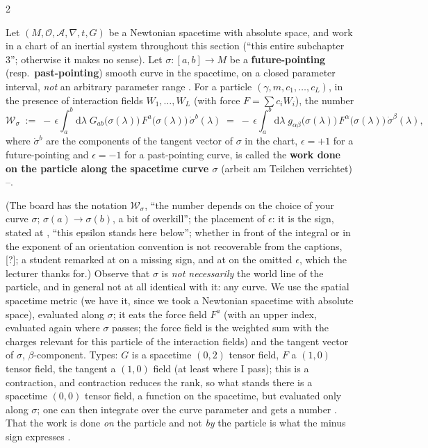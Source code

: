 \begin{paracol}{2}
\begin{definition}\label{def:nd-work}
Let $(M,\mathcal O,\mathcal A,\nabla,t,G)$ be a Newtonian spacetime with absolute space, and work in a chart of an inertial system throughout this section (``this entire subchapter 3''; otherwise it makes no sense). Let $\sigma\colon[a,b]\to M$ be a
\textbf{future-pointing} (resp.\ \textbf{past-pointing}) smooth curve in the spacetime, on a closed parameter interval, \emph{not} an arbitrary parameter range . For a particle $(\gamma,m,c_1,\dots,c_L)$, in the presence of interaction fields $W_1,\dots,W_L$ (with force $F=\sum c_iW_i$), the number
\begin{equation}\label{eq:nd-work}
  \mathcal W_{\sigma}\;:=\;-\,\epsilon\int_a^b\mathrm d\lambda\;G_{ab}\bigl(\sigma(\lambda)\bigr)\,F^{a}\bigl(\sigma(\lambda)\bigr)\,\dot\sigma^{b}(\lambda)
  \;=\;-\,\epsilon\int_a^b\mathrm d\lambda\;g_{\alpha\beta}\bigl(\sigma(\lambda)\bigr)\,F^{\alpha}\bigl(\sigma(\lambda)\bigr)\,\dot\sigma^{\beta}(\lambda),
\end{equation}
where $\dot\sigma^b$ are the components of the tangent vector of $\sigma$ in the chart, $\epsilon=+1$ for a future-pointing and $\epsilon=-1$ for a past-pointing curve, is called the \textbf{work done on the particle along the spacetime curve $\sigma$} (arbeit am Teilchen verrichtet) --.
\end{definition}
(The board has the notation $\mathcal W_{\sigma}$, ``the number depends on the choice of your curve $\sigma$; $\sigma(a)\to\sigma(b)$, a bit of overkill''; the placement of $\epsilon$: it is the sign, stated at , ``this epsilon stands here below''; whether in front of the integral or in the exponent of an orientation convention is not recoverable from the captions, [?]; a student remarked at  on a missing sign, and at  on the omitted $\epsilon$, which the lecturer thanks for.)
Observe that $\sigma$ is \emph{not necessarily} the world line of the particle, and in general not at all identical with it: any curve. We use the spatial spacetime metric (we have it, since we took a Newtonian spacetime with absolute space), evaluated along $\sigma$; it eats the force field $F^a$ (with an upper index, evaluated again where $\sigma$ passes;
the force field is the weighted sum with the charges relevant for this particle of the interaction fields) and the tangent vector of $\sigma$, $\beta$-component. Types: $G$ is a spacetime $(0,2)$ tensor field, $F$ a $(1,0)$ tensor field, the tangent a $(1,0)$ field (at least where I pass); this is a contraction, and contraction reduces the rank, so what stands there is a spacetime $(0,0)$ tensor field, a function on the spacetime, but evaluated only along $\sigma$; one can then integrate over the curve parameter and gets a number .
That the work is done \emph{on} the particle and not \emph{by} the particle is what the minus sign expresses .


\end{paracol}
